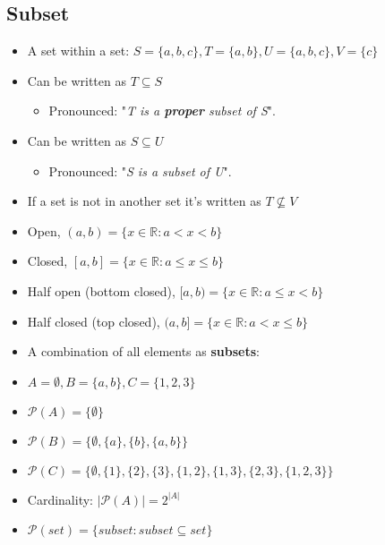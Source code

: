\documentclass[english,10pt,a4paper]{article}
\begin{document}
\subsection{Subset}
\begin{theo}[Basic]
\begin{itemize}
\item A set within a set: $S=\{a, b, c\}, T = \{a, b \}, U= \{ a, b, c\}, V=\{c\}$
\item Can be written as $T \subseteq S$
	\begin{itemize}
	\item Pronounced: "\textit{T is a \textbf{proper} subset of S}".
	\end{itemize}
\item Can be written as $S \subseteq U$
	\begin{itemize}
	\item Pronounced: "\textit{S is a subset of U}".
	\end{itemize}
	
\item If a set is not in another set it's written as $T \not \subseteq V$
\end{itemize}
\end{theo}


\begin{theo}[Intervals] 
\begin{itemize}
\item Open, $(a,b) = \{ x \in \mathbb{R}: a < x < b \}$
\item Closed, $[a,b] = \{ x \in \mathbb{R}: a \leq x \leq b \}$
\item Half open (bottom closed), $[a,b) = \{ x \in \mathbb{R}: a \leq x < b \}$
\item Half closed (top closed), $(a,b] = \{ x \in \mathbb{R}: a < x \leq b \}$
\end{itemize}
\end{theo}


\begin{theo} 
\begin{itemize}
\item A combination of all elements as \textbf{subsets}:
\item[] $A=\emptyset, B= \{a,b\}, C=\{1,2,3\}$
\item $\mathcal{P}(A) = \{\emptyset\} $
\item $\mathcal{P}(B) = \{\emptyset, \{a\}, \{b\}, \{a,b\} \}$
\item $\mathcal{P}(C) = \{\emptyset, \{1\}, \{2\}, \{3\}, \{1,2\}, \{1,3\}, \{2, 3\}, \{1,2,3\} \}$
\item Cardinality: $|\mathcal{P}(A)| = 2^{|A|}$
\item $\mathcal{P}(set) = \{subset : subset \subseteq set\}$
\end{itemize}
\end{theo}
\end{document}
